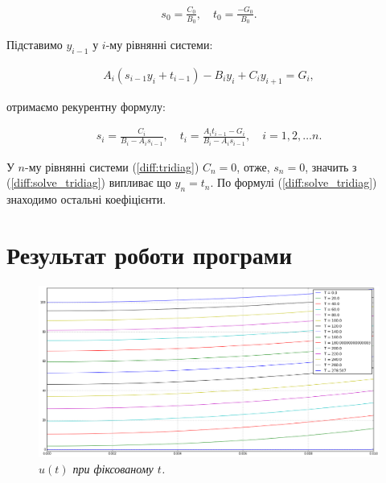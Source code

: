 \begin{equation}
\begin{multlined} 
s_0 = \frac{C_0}{B_0}, \quad t_0 = \frac{-G_0}{B_0}.
\end{multlined}
\end{equation}

Підставимо \( y_{i-1} \) у \(i\)-му рівнянні системи:

\begin{equation}
\begin{multlined} 
A_i\left(s_{i-1}y_i + t_{i-1}\right) - B_i y_i + C_iy_{i+1} = G_i,
\end{multlined}
\end{equation}

отримаємо рекурентну формулу:

\begin{equation}
\begin{multlined} 
s_i = \frac{C_i}{B_i-A_is_{i-1}}, \quad t_i = \frac{A_it_{i-1}-G_i}{B_i-A_is_{i-1}}, \quad i = 1, 2, \dots n.
\end{multlined}
\end{equation}

У \(n\)-му рівнянні системи (\ref{diff:tridiag}) \(C_n = 0\), отже, \(s_n = 0\), значить з (\ref{diff:solve_tridiag}) випливає що \(y_n = t_n\). По формулі (\ref{diff:solve_tridiag}) знаходимо остальні коефіцієнти.


\section{Результат роботи програми}
\begin{figure}[h!]
  \centering
  \includegraphics[width=.9\linewidth]{res0}
  \caption{\it \( u(t)\) при фіксованому \(t\).}
\end{figure}

